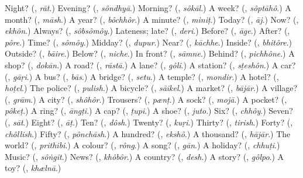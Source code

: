 \begin{tcolorbox}[breakable,colback=teal!4,colframe=teal!35!black,title={Before you move on}]
Night? (\textbf{}, \emph{rāt}.) Evening? (\textbf{}, \emph{sôndhyā}.) Morning? (\textbf{}, \emph{sôkāl}.) A week? (\textbf{}, \emph{sôptāhô}.) A month? (\textbf{}, \emph{māsh}.) A year? (\textbf{}, \emph{bôchhôr}.) A minute? (\textbf{}, \emph{miniṭ}.) Today? (\textbf{}, \emph{āj}.) Now? (\textbf{}, \emph{ekhôn}.) Always? (\textbf{}, \emph{sôbsômôy}.) Lateness; late? (\textbf{}, \emph{deri}.) Before? (\textbf{}, \emph{āge}.) After? (\textbf{}, \emph{pôre}.) Time? (\textbf{}, \emph{sômôy}.) Midday? (\textbf{}, \emph{dupur}.) Near? (\textbf{}, \emph{kāchhe}.) Inside? (\textbf{}, \emph{bhitôre}.) Outside? (\textbf{}, \emph{bāire}.) Below? (\textbf{}, \emph{niche}.) In front? (\textbf{}, \emph{sāmne}.) Behind? (\textbf{}, \emph{pichhône}.) A shop? (\textbf{}, \emph{dokān}.) A road? (\textbf{}, \emph{rāstā}.) A lane? (\textbf{}, \emph{gôli}.) A station? (\textbf{}, \emph{sṭeshôn}.) A car? (\textbf{}, \emph{gāṛi}.) A bus? (\textbf{}, \emph{bās}.) A bridge? (\textbf{}, \emph{setu}.) A temple? (\textbf{}, \emph{mondir}.) A hotel? (\textbf{}, \emph{hoṭel}.) The police? (\textbf{}, \emph{pulish}.) A bicycle? (\textbf{}, \emph{sāikel}.) A market? (\textbf{}, \emph{bājār}.) A village? (\textbf{}, \emph{grām}.) A city? (\textbf{}, \emph{shôhôr}.) Trousers? (\textbf{}, \emph{pænṭ}.) A sock? (\textbf{}, \emph{mojā}.) A pocket? (\textbf{}, \emph{pôkeṭ}.) A ring? (\textbf{}, \emph{āngṭi}.) A cap? (\textbf{}, \emph{ṭupi}.) A shoe? (\textbf{}, \emph{juto}.) Six? (\textbf{}, \emph{chhôy}.) Seven? (\textbf{}, \emph{sāt}.) Eight? (\textbf{}, \emph{āṭ}.) Ten? (\textbf{}, \emph{dôsh}.) Twenty? (\textbf{}, \emph{kuṛi}.) Thirty? (\textbf{}, \emph{tirish}.) Forty? (\textbf{}, \emph{chôllish}.) Fifty? (\textbf{}, \emph{pônchāsh}.) A hundred? (\textbf{}, \emph{ekshô}.) A thousand? (\textbf{}, \emph{hājār}.) The world? (\textbf{}, \emph{prithibi}.) A colour? (\textbf{}, \emph{rông}.) A song? (\textbf{}, \emph{gān}.) A holiday? (\textbf{}, \emph{chhuṭi}.) Music? (\textbf{}, \emph{sôṅgit}.) News? (\textbf{}, \emph{khôbôr}.) A country? (\textbf{}, \emph{desh}.) A story? (\textbf{}, \emph{gôlpo}.) A toy? (\textbf{}, \emph{khælnā}.)
\end{tcolorbox}
